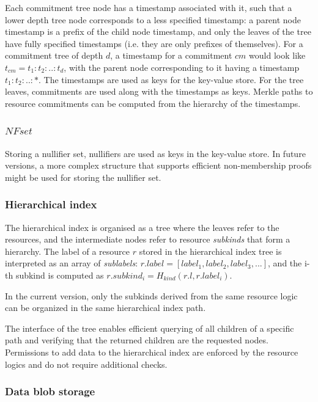 Each commitment tree node has a timestamp associated with it, such that a lower depth tree node corresponds to a less specified timestamp: a parent node timestamp is a prefix of the child node timestamp, and only the leaves of the tree have fully specified timestamps (i.e. they are only prefixes of themselves). For a commitment tree of depth $d$, a timestamp for a commitment $cm$ would look like $t_{cm} =t_1:t_2:..:t_d$, with the parent node corresponding to it having a timestamp $t_1:t_2:..:*$. The timestamps are used as keys for the key-value store. For the tree leaves, commitments are used along with the timestamps as keys. Merkle paths to resource commitments can be computed from the hierarchy of the timestamps.

\subsubsection{$NFset$}

Storing a nullifier set, nullifiers are used as keys in the key-value store. In future versions, a more complex structure that supports efficient non-membership proofs might be used for storing the nullifier set.

\subsubsection{Hierarchical index}
The hierarchical index is organised as a tree where the leaves refer to the resources, and the intermediate nodes refer to resource \textit{subkinds} that form a hierarchy. The label of a resource $r$ stored in the hierarchical index tree is interpreted as an array of \textit{sublabels}: $r.label = [label_1, label_2, label_3, ...]$, and the i-th subkind is computed as $r.subkind_i = H_{kind}(r.l, r.label_i)$.

\begin{remark}
    In the current version, only the subkinds derived from the same resource logic can be organized in the same hierarchical index path.
\end{remark}

The interface of the tree enables efficient querying of all children of a specific path and verifying that the returned children are the requested nodes. Permissions to add data to the hierarchical index are enforced by the resource logics and do not require additional checks.

\subsubsection{Data blob storage}

